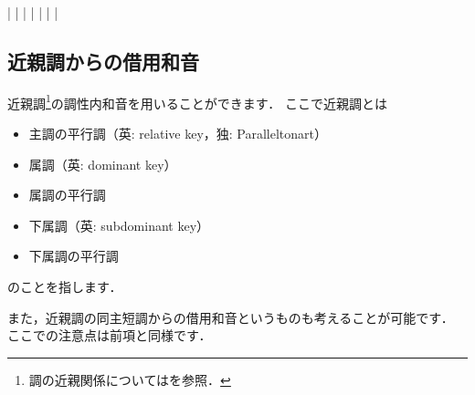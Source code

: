 \documentclass[dvipdfmx,uplatex,b5paper,openany,jbase=12Q,nomag*,textwidth-limit=44%
               ]{gachimuchi}
\begin{document}

\begin{Music}
  \generalmeter{\meterC}%
  \Startpiece%
  \NOTes%
  |%
  \en%
  \NOTes%
  |%
  \en\bar%
  \NOTes%
  |%
  \en%
  \NOTes%
  |%
  \en\bar%
  \NOTEs%
  |%
  \en\setdoublebar%
  \endpiece{}%
\end{Music}


\subsection{近親調からの借用和音}
近親調\footnote{調の近親関係についてはを参照．}の調性内和音を用いることができます．
ここで近親調とは
\begin{itemize}
  \item 主調の平行調（英: relative key，独: Paralleltonart）
  \item 属調（英: dominant key）
  \item 属調の平行調
  \item 下属調（英: subdominant key）
  \item 下属調の平行調
\end{itemize}
のことを指します．


また，近親調の同主短調からの借用和音というものも考えることが可能です．
ここでの注意点は前項と同様です．
\end{document}
